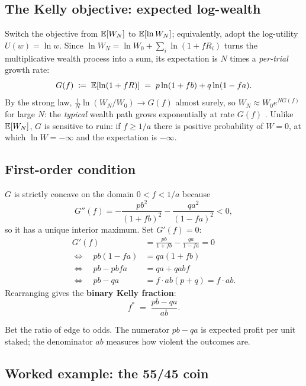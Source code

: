 \subsection{The Kelly objective: expected log-wealth}

Switch the objective from $\mathbb{E}[W_N]$ to $\mathbb{E}[\ln W_N]$; equivalently,
adopt the log-utility $U(w) = \ln w$. Since $\ln W_N = \ln W_0 +
\sum_i \ln(1 + fR_i)$ turns the multiplicative wealth process into
a sum, its expectation is $N$ times a \emph{per-trial} growth rate:
\begin{equation}
  G(f) \;\coloneqq\; \mathbb{E}[\ln(1 + fR)]
  \;=\; p\ln(1 + fb) + q\ln(1 - fa).
\end{equation}
By the strong law, $\frac{1}{N}\ln(W_N / W_0) \to G(f)$ almost
surely, so $W_N \approx W_0 e^{NG(f)}$ for large $N$: the
\emph{typical} wealth path grows exponentially at rate $G(f)$
\citeThorp. Unlike $\mathbb{E}[W_N]$, $G$ is sensitive to ruin: if
$f \geq 1/a$ there is positive probability of $W = 0$, at which
$\ln W = -\infty$ and the expectation is $-\infty$.

\subsection{First-order condition}

$G$ is strictly concave on the domain $0 < f < 1/a$ because
\begin{equation}
  G''(f) = -\frac{pb^2}{(1+fb)^2} - \frac{qa^2}{(1-fa)^2} < 0,
\end{equation}
so it has a unique interior maximum. Set $G'(f) = 0$:
\begin{align}
  G'(f) &= \frac{pb}{1+fb} - \frac{qa}{1-fa} = 0
  \\
  \Longleftrightarrow\quad pb(1-fa) &= qa(1+fb)
  \\
  \Longleftrightarrow\quad pb - pbfa &= qa + qabf
  \\
  \Longleftrightarrow\quad pb - qa &= f \cdot ab(p + q) = f\cdot ab.
\end{align}
Rearranging gives the \textbf{binary Kelly fraction}:
\begin{equation}
  \boxed{\;f^{*} \;=\; \frac{pb - qa}{ab}.\;}
  \label{eq:kelly_binary}
\end{equation}

Bet the ratio of edge to odds. The numerator $pb - qa$ is expected
profit per unit staked; the denominator $ab$ measures how violent
the outcomes are.

\subsection{Worked example: the 55/45 coin}
\label{sec:kelly_worked_55_45}

